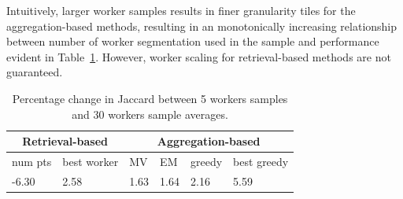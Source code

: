Intuitively, larger worker samples results in finer granularity tiles for the aggregation-based methods, resulting in an monotonically increasing relationship between number of worker segmentation used in the sample and performance evident in Table~\ref{workerScaling}. However, worker scaling for retrieval-based methods are not guaranteed.
   \begin{table}
   \small
     \setlength\tabcolsep{1.5pt}
      \begin{tabular}{l|l|llll}
      \multicolumn{2}{c|}{Retrieval-based} & \multicolumn{4}{c}{Aggregation-based}                                                             \\ \hline
      num pts         & best worker        & \multicolumn{1}{l|}{MV}   & \multicolumn{1}{l|}{EM}   & \multicolumn{1}{l|}{greedy} & best greedy \\ \hline
      -6.30           & 2.58               & \multicolumn{1}{l|}{1.63} & \multicolumn{1}{l|}{1.64} & \multicolumn{1}{l|}{2.16}   & 5.59       
      \end{tabular}
      \caption{Percentage change in Jaccard between 5 workers samples and 30 workers sample averages.}
      \label{workerScaling}
      \vspace{-10pt}
   \end{table}